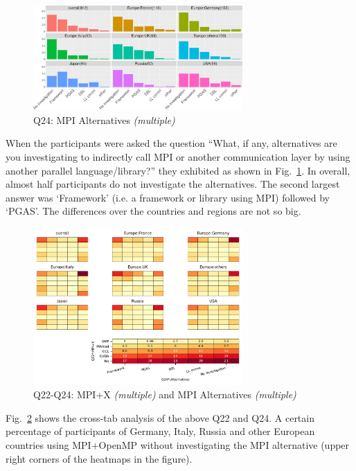 \documentclass[conference,10pt,letterpaper]{IEEEtran}
\def\myquote#1{`#1'}
\begin{document}
\begin{figure}[htb]
\begin{center}
\includegraphics[width=8cm]{R-scripts/Q24.pdf}
\caption{Q24: MPI Alternatives {\it(multiple)}}
\label{fig:mpi-alternatives}
\end{center}
\end{figure}

When the participants were asked the question ``What, if any,
alternatives are you investigating to indirectly call MPI or another
communication layer by using another parallel language/library?'' they
exhibited as shown in Fig.~\ref{fig:mpi-alternatives}. In overall,
almost half participants do not investigate the alternatives. The second
largest answer was \myquote{Framework} (i.e. a framework or library
using MPI) followed by \myquote{PGAS}. The
differences over the countries and regions are not so big. 
  
\begin{figure}[htb]
\begin{center}
\includegraphics[width=8cm]{Figs/Q22-Q24.pdf}
\caption{Q22-Q24: MPI+X {\it(multiple)} and MPI Alternatives {\it(multiple)}}
\label{fig:mpi-x-and-alternatives}
\end{center}
\end{figure}

Fig.~\ref{fig:mpi-x-and-alternatives} shows the cross-tab analysis of
the above Q22 and Q24. A certain percentage of participants of
Germany, Italy, Russia and other European countries using MPI+OpenMP
without investigating the MPI alternative (upper right corners of the
heatmaps in the figure). 
\end{document}
